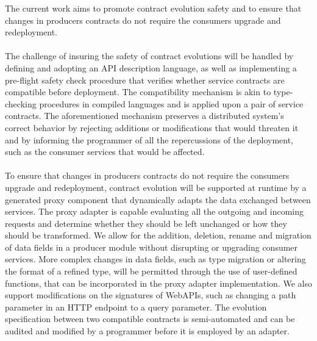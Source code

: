 The current  work  aims to promote contract evolution safety and to ensure that changes in producers contracts do not require the consumers upgrade and redeployment.

\paragraph{}

The challenge of insuring the safety of contract evolutions will be handled by defining and adopting an API description language, as well as implementing
a pre-flight safety check procedure that verifies whether service contracts are compatible before deployment.
The compatibility mechanism is akin to type-checking procedures in compiled languages and is applied upon a
pair of service contracts.
The aforementioned mechanism preserves a distributed system's correct behavior by rejecting additions or modifications that would threaten it and by informing the programmer
of all the repercussions of the deployment, such as the consumer services that would be affected.

\paragraph{}

To ensure that changes in producers contracts do not require the consumers upgrade and redeployment, contract evolution
will be supported at runtime by a generated proxy component that dynamically adapts the data exchanged between services.
The proxy adapter is capable evaluating all the outgoing and incoming requests and determine whether
they should be left unchanged or how they should be transformed.
We allow for the addition, deletion, rename and migration of data fields in a producer module without disrupting or upgrading consumer services.
More complex changes in data fields, such as type migration or altering the format of a refined type,
will be permitted through the use of user-defined functions, that can be incorporated in the proxy adapter implementation.
We also support modifications on the signatures of WebAPIs, such as changing a path parameter in an HTTP endpoint to a query parameter.
The evolution specification between two compatible contracts is semi-automated and can be audited and modified by a programmer before it is employed by an adapter.

\paragraph{}

